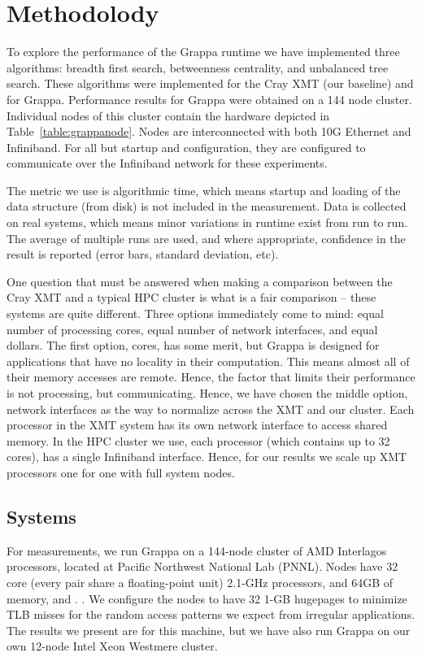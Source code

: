 \section{Methodolody} \label{sec:method}

To explore the performance of the Grappa runtime we have implemented three algorithms: breadth first search, betweenness centrality, and unbalanced tree search.  These algorithms were implemented for the Cray XMT (our baseline) and for Grappa.  Performance results for Grappa were obtained on a 144 node cluster.  Individual nodes of this cluster contain the hardware depicted in Table~\ref{table:grappanode}.  Nodes are interconnected with both 10G Ethernet and Infiniband.  For all but startup and configuration, they are configured to communicate over the Infiniband network for these experiments.

The metric we use is algorithmic time, which means startup and loading of the data structure (from disk) is not included in the measurement.  Data is collected on real systems, which means minor variations in runtime exist from run to run.  The average of multiple runs are used, and where appropriate, confidence in the result is reported (error bars, standard deviation, etc).

One question that must be answered when making a comparison between
the Cray XMT and a typical HPC cluster is what is a fair comparison --
these systems are quite different.  Three options immediately come to
mind: equal number of processing cores, equal number of network
interfaces, and equal dollars.    The first option, cores,
has some merit, but Grappa is designed for applications that have no
locality in their computation.  This means almost all of their memory
accesses are remote.  Hence, the factor that limits their performance
is not processing, but communicating.  Hence, we have chosen the
middle option, network interfaces as the way to normalize across the
XMT and our cluster.  Each processor in the XMT system has its own
network interface to access shared memory.  In the HPC cluster we use,
each processor (which contains up to 32 cores), has a single Infiniband interface.  Hence, for our results we scale up XMT processors one for one with full system nodes.



\subsection{Systems}
For measurements, we run Grappa on a 144-node cluster of AMD
Interlagos processors, located at Pacific Northwest National Lab
(PNNL). Nodes have 32 core (every pair share a floating-point
unit) 2.1-GHz processors, and 64GB of memory, and . . We configure the nodes to have 32 1-GB
hugepages to minimize TLB misses for the random access patterns we
expect from irregular applications. The results we present are for
this machine, but we have also run Grappa on our own 12-node Intel
Xeon Westmere cluster.

